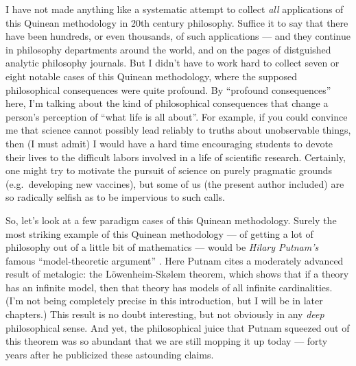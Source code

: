 I have not made anything like a systematic attempt to collect {\it
  all} applications of this Quinean methodology in 20th century
philosophy.  Suffice it to say that there have been hundreds, or even
thousands, of such applications --- and they continue in philosophy
departments around the world, and on the pages of distguished analytic
philosophy journals.  But I didn't have to work hard to collect seven
or eight notable cases of this Quinean methodology, where the supposed
philosophical consequences were quite profound.  By ``profound
consequences'' here, I'm talking about the kind of philosophical
consequences that change a person's perception of ``what life is all
about''.  For example, if you could convince me that science cannot
possibly lead reliably to truths about unobservable things, then (I
must admit) I would have a hard time encouraging students to devote
their lives to the difficult labors involved in a life of scientific
research.  Certainly, one might try to motivate the pursuit of science
on purely pragmatic grounds (e.g.\ developing new vaccines), but some
of us (the present author included) are so radically selfish as to be
impervious to such calls.

So, let's look at a few paradigm cases of this Quinean methodology.
Surely the most striking example of this Quinean methodology --- of
getting a lot of philosophy out of a little bit of mathematics ---
would be \emph{Hilary Putnam's} famous ``model-theoretic argument''
\citep{putnam1977,putnam-models}.  Here Putnam cites a moderately
advanced result of metalogic: the L{\"o}wenheim-Sk{\o}lem theorem,
which shows that if a theory has an infinite model, then that theory
has models of all infinite cardinalities.  (I'm not being completely
precise in this introduction, but I will be in later chapters.)  This
result is no doubt interesting, but not obviously in any {\it deep}
philosophical sense.  And yet, the philosophical juice that Putnam
squeezed out of this theorem was so abundant that we are still mopping
it up today --- forty years after he publicized these astounding
claims.

